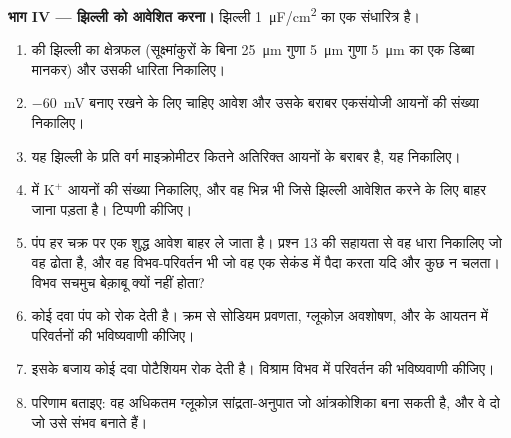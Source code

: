 \begin{problem}
\medskip
\noindent\textbf{भाग IV --- झिल्ली को आवेशित करना।}
झिल्ली \qty{1}{\micro F/cm^2} का एक संधारित्र है।
\begin{enumerate}[resume]
  \item {} की झिल्ली का क्षेत्रफल (सूक्ष्मांकुरों के बिना
        \qty{25}{\micro m} गुणा \qty{5}{\micro m} गुणा
        \qty{5}{\micro m} का एक डिब्बा मानकर) और उसकी धारिता निकालिए।
  \item \qty{-60}{mV} बनाए रखने के लिए चाहिए आवेश और उसके बराबर एकसंयोजी
        आयनों की संख्या निकालिए।
  \item यह झिल्ली के प्रति वर्ग माइक्रोमीटर कितने अतिरिक्त आयनों के
        बराबर है, यह निकालिए।
  \item {} में $\mathrm{K^+}$ आयनों की संख्या निकालिए, और वह भिन्न
        भी जिसे झिल्ली आवेशित करने के लिए बाहर जाना पड़ता है। टिप्पणी
        कीजिए।
  \item पंप हर चक्र पर एक शुद्ध आवेश बाहर ले जाता है। प्रश्न 13 की
        सहायता से वह धारा निकालिए जो वह ढोता है, और वह विभव-परिवर्तन भी
        जो वह एक सेकंड में पैदा करता यदि और कुछ न चलता। विभव सचमुच
        बेक़ाबू क्यों नहीं होता?
  \item कोई दवा पंप को रोक देती है। क्रम से सोडियम प्रवणता, ग्लूकोज़
        अवशोषण,  और  के आयतन में परिवर्तनों की
        भविष्यवाणी कीजिए।
  \item इसके बजाय कोई दवा पोटैशियम  रोक देती है। विश्राम विभव में
        परिवर्तन की भविष्यवाणी कीजिए।
  \item परिणाम बताइए: वह अधिकतम ग्लूकोज़ सांद्रता-अनुपात जो
        आंत्रकोशिका बना सकती है, और वे दो  जो उसे संभव
        बनाते हैं।
\end{enumerate}
\end{problem}
